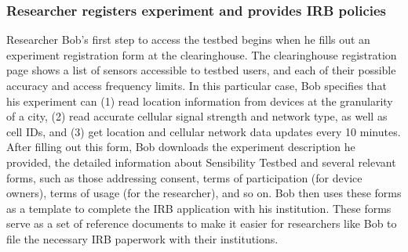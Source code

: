 
\subsubsection{Researcher registers experiment and provides IRB policies}
\label{sec-case2}
 Researcher Bob's first step to access the testbed begins when he
fills out an experiment registration form at the 
clearinghouse. The clearinghouse registration page shows 
a list of sensors accessible to testbed users, and 
each of their possible accuracy and access frequency limits. 
In this particular case, Bob specifies that 
his experiment can (1) read location information
from devices at the granularity of a city, (2) read accurate
cellular signal strength and network type, as well as
cell IDs, and (3) get location and
cellular network data updates every 10 minutes. 
%
After filling out this form, Bob downloads the experiment description 
he provided, the detailed information about Sensibility Testbed and 
several relevant forms, such as 
those addressing consent, terms of participation (for device owners),  
terms of usage (for the researcher), and so on.   
Bob then uses these forms as a template to complete the IRB application 
with his institution. These forms serve as a set of reference documents 
to make it easier for researchers like Bob to 
file the necessary IRB paperwork with their institutions.


